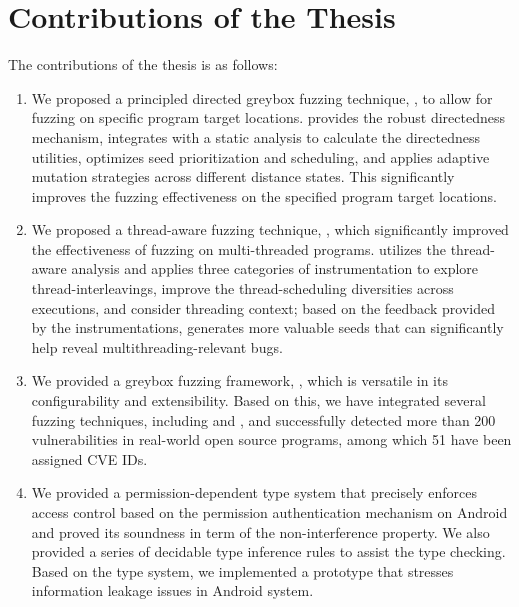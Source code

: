 \section{Contributions of the Thesis}
The contributions of the thesis is as follows:
\begin{enumerate}
        \item We proposed a principled directed greybox fuzzing technique, \dFOT, to allow for fuzzing on specific program target locations. \dFOT provides the robust directedness mechanism, integrates with a static analysis to calculate the directedness utilities, optimizes seed prioritization and scheduling, and applies adaptive mutation strategies across different distance states. This significantly improves the fuzzing effectiveness on the specified program target locations.
        \item We proposed a thread-aware fuzzing technique, \mtfuzz, which significantly improved the effectiveness of fuzzing on multi-threaded programs. \mtfuzz utilizes the thread-aware analysis and applies three categories of instrumentation to explore thread-interleavings,  improve the thread-scheduling diversities across executions, and consider threading context; based on the feedback provided by the instrumentations, \mtfuzz generates more valuable seeds that can significantly help reveal multithreading-relevant bugs.
        \item We provided a greybox fuzzing framework, \FOT, which is versatile in its configurability and extensibility. Based on this, we have integrated several fuzzing techniques, including \dFOT and \mtfuzz, and successfully detected more than 200 vulnerabilities in real-world open source programs, among which 51 have been assigned CVE IDs.
        \item We provided a permission-dependent type system that precisely enforces access control based on the permission authentication mechanism on Android and proved its soundness in term of the non-interference property. We also provided a series of decidable type inference rules to assist the type checking. Based on the type system, we implemented a prototype that stresses information leakage issues in Android system.
\end{enumerate}


